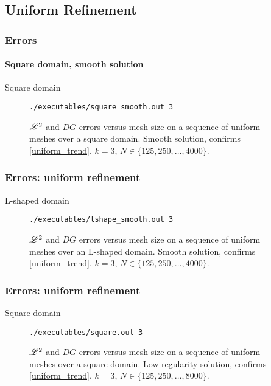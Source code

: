 \subsection{Uniform Refinement}

\begin{frame}[fragile]
    \frametitle{Errors}
    \framesubtitle{Square domain, smooth solution}

    \begin{description}
        \item[Square domain] \lstinline{./executables/square_smooth.out 3}
    \end{description}    

    \begin{figure}[!ht]
        
        \caption{$\mathscr{L}^2$ and $DG$ errors versus mesh size on a sequence of uniform meshes over a square domain. Smooth solution, confirms \eqref{uniform_trend}. $k = 3$, $N \in \{125, 250, \dots, 4000\}$.}
    \end{figure}
\end{frame}

\begin{frame}[fragile]
    \frametitle{Errors: uniform refinement}

    \begin{description}
        \item[L-shaped domain] \lstinline{./executables/lshape_smooth.out 3}
    \end{description}

    \begin{figure}[!ht]
        
        \caption{$\mathscr{L}^2$ and $DG$ errors versus mesh size on a sequence of uniform meshes over an L-shaped domain. Smooth solution, confirms \eqref{uniform_trend}. $k = 3$, $N \in \{125, 250, \dots, 4000\}$.}
    \end{figure}
\end{frame}

\begin{frame}[fragile]
    \frametitle{Errors: uniform refinement}

    \begin{description}
        \item[Square domain] \lstinline{./executables/square.out 3}
    \end{description}    

    \begin{figure}[!ht]
        
        \caption{$\mathscr{L}^2$ and $DG$ errors versus mesh size on a sequence of uniform meshes over a square domain. Low-regularity solution, confirms \eqref{uniform_trend}. $k = 3$, $N \in \{125, 250, \dots, 8000\}$.}
    \end{figure}
\end{frame}

